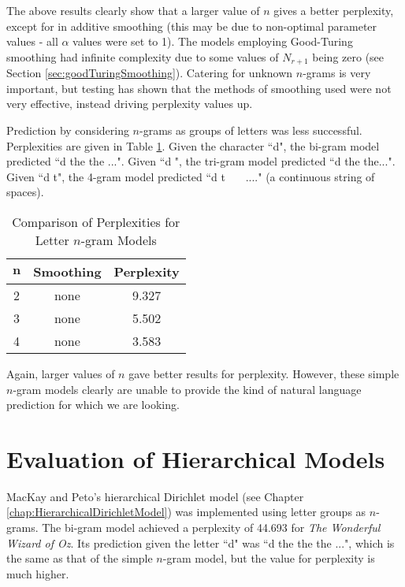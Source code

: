 The above results clearly show that a larger value of $n$ gives a better perplexity, except for in additive smoothing (this may be due to non-optimal parameter values - all $\alpha$ values were set to 1). The models employing Good-Turing smoothing had infinite complexity due to some values of $N_{r+1}$ being zero (see Section \ref{sec:goodTuringSmoothing}). Catering for unknown $n$-grams is very important, but testing has shown that the methods of smoothing used were not very effective, instead driving perplexity values up. 

Prediction by considering $n$-grams as groups of letters was less successful. Perplexities are given in Table \ref{table:letterPerplexity}. Given the character ``d", the bi-gram model predicted ``d the the ...". Given ``d ", the tri-gram model predicted ``d the the...". Given ``d t", the 4-gram model predicted ``d t \ \ \ ...." (a continuous string of spaces).

\begin{table}[h!]
\caption{Comparison of Perplexities for Letter $n$-gram Models}
\label{table:letterPerplexity}
\begin{center}
\begin{tabular}{|c|c|c|}
\hline
$\boldsymbol{n}$ & \textbf{Smoothing} & \textbf{Perplexity} \\ \hline
2 & none & 9.327 \\ \hline
3 & none & 5.502 \\ \hline
4 & none & 3.583 \\ \hline
\end{tabular}
\end{center}
\end{table}

Again, larger values of $n$ gave better results for perplexity. However, these simple $n$-gram models clearly are unable to provide the kind of natural language prediction for which we are looking.

\section{Evaluation of Hierarchical Models}

MacKay and Peto's hierarchical Dirichlet model (see Chapter \ref{chap:HierarchicalDirichletModel}) was implemented using letter groups as $n$-grams. The bi-gram model achieved a perplexity of 44.693 for \textit{The Wonderful Wizard of Oz}. Its prediction given the letter ``d" was ``d the the the ...", which is the same as that of the simple $n$-gram model, but the value for perplexity is much higher. 


